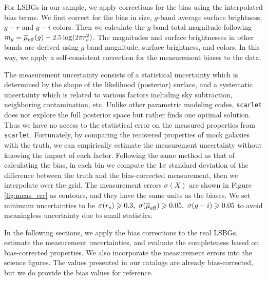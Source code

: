 \documentclass[twocolumn,astrosymb,twocolappendix]{aastex631}
\newcommand{\code}[1]{\texttt{#1}}
\begin{document}
\begin{CJK*}{UTF8}{gbsn}
For LSBGs in our sample, we apply corrections for the bias using the interpolated bias terms. We first correct for the bias in size, $g$-band average surface brightness, $g-r$ and $g-i$ colors. Then we calculate the $g$-band total magnitude following $m_g = \overline{\mu}_{\rm eff}(g) - 2.5\log(2\pi r_e^2)$. The magnitudes and surface brightnesses in other bands are derived using $g$-band magnitude, surface brightness, and colors. In this way, we apply a self-consistent correction for the measurement biases to the data. 

The measurement uncertainty consists of a statistical uncertainty which is determined by the shape of the likelihood (posterior) surface, and a systematic uncertainty which is related to various factors including sky subtraction, neighboring contamination, etc. Unlike other parametric modeling codes, \code{scarlet} does not explore the full posterior space but rather finds one optimal solution. Thus we have no access to the statistical error on the measured properties from \code{scarlet}. Fortunately, by comparing the recovered properties of mock galaxies with the truth, we can empirically estimate the measurement uncertainty without knowing the impact of each factor. Following the same method as that of calculating the bias, in each bin we compute the $1\sigma$ standard deviation of the difference between the truth and the bias-corrected measurement, then we interpolate over the grid. The measurement errors $\sigma(X)$ are shown in Figure \ref{fig:meas_err} as contours, and they have the same units as the biases. We set minimum uncertainties to be $\sigma(r_e) \geqslant 0.3,\ \sigma(\overline{\mu}_{\rm eff}) \geqslant 0.05,\ \sigma(g-i) \geqslant 0.05$ to avoid meaningless uncertainty due to small statistics.

In the following sections, we apply the bias corrections to the real LSBGs, estimate the measurement uncertainties, and evaluate the completeness based on bias-corrected properties. We also incorporate the measurement errors into the science figures. The values presented in our catalogs are already bias-corrected, but we do provide the bias values for reference. 




\end{CJK*}
\end{document}
